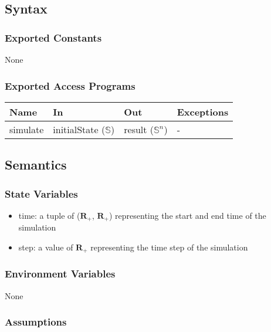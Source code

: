 \documentclass[12pt, titlepage]{article}
\begin{document}
\subsection{Syntax}

\subsubsection{Exported Constants}
None

\subsubsection{Exported Access Programs}

\begin{center}
\begin{tabular}{p{2cm} p{4cm} p{4cm} p{2cm}}
\hline
\textbf{Name} & \textbf{In} & \textbf{Out} & \textbf{Exceptions} \\
\hline
simulate & initialState ($\mathbb{S}$) & result ($\mathbb{S}^n$) & - \\
\hline
\end{tabular}
\end{center}

\subsection{Semantics}

\subsubsection{State Variables}

\begin{itemize}
  \item time: a tuple of ($\mathbf{R}_{+}$, $\mathbf{R}_{+}$) representing the start and end time of the simulation
  \item step: a value of $\mathbf{R}_{+}$ representing the time step of the simulation
\end{itemize}

\subsubsection{Environment Variables}

None

\subsubsection{Assumptions}
\end{document}
